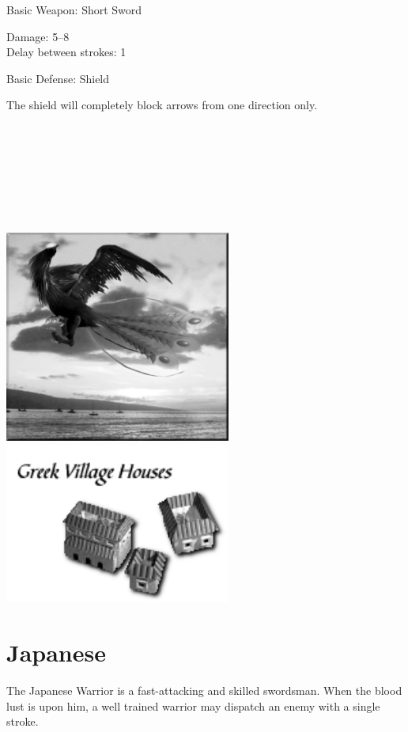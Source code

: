 Basic Weapon: Short Sword
\begin{adjustwidth}{1cm}{}
	Damage: 5–8 \\
	Delay between strokes: 1
\end{adjustwidth}
Basic Defense: Shield
\begin{adjustwidth}{1cm}{}
	The shield will completely block arrows from one direction only. \\ \\ \\ \\ \\ \\ \\ \\ 
\end{adjustwidth}

\begin{center}
	\includegraphics[width=74.25mm]{Aphoenix}\includegraphics[width=74.25mm]{Igreekhouse}
\end{center}

\clearpage

\section{Japanese}

The Japanese Warrior is a fast-attacking and skilled swordsman. When the blood lust is upon him, a well trained warrior may dispatch an enemy with a single stroke.

